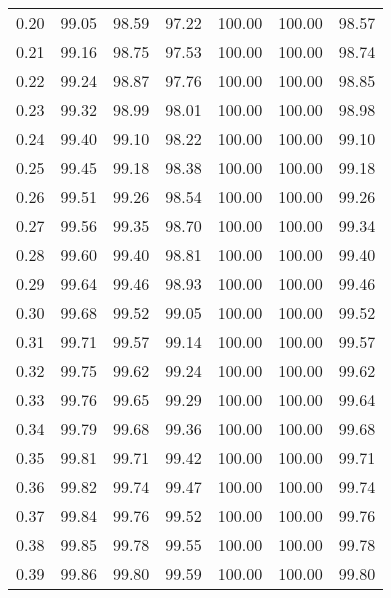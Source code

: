 \begin{tabular}{|c|c|c|c|c|c|c|}
      0.20 &     99.05 &     98.59 &      97.22 &  100.00 &     100.00 &         98.57 \\
      0.21 &     99.16 &     98.75 &      97.53 &  100.00 &     100.00 &         98.74 \\
      0.22 &     99.24 &     98.87 &      97.76 &  100.00 &     100.00 &         98.85 \\
      0.23 &     99.32 &     98.99 &      98.01 &  100.00 &     100.00 &         98.98 \\
      0.24 &     99.40 &     99.10 &      98.22 &  100.00 &     100.00 &         99.10 \\
      0.25 &     99.45 &     99.18 &      98.38 &  100.00 &     100.00 &         99.18 \\
      0.26 &     99.51 &     99.26 &      98.54 &  100.00 &     100.00 &         99.26 \\
      0.27 &     99.56 &     99.35 &      98.70 &  100.00 &     100.00 &         99.34 \\
      0.28 &     99.60 &     99.40 &      98.81 &  100.00 &     100.00 &         99.40 \\
      0.29 &     99.64 &     99.46 &      98.93 &  100.00 &     100.00 &         99.46 \\
      0.30 &     99.68 &     99.52 &      99.05 &  100.00 &     100.00 &         99.52 \\
      0.31 &     99.71 &     99.57 &      99.14 &  100.00 &     100.00 &         99.57 \\
      0.32 &     99.75 &     99.62 &      99.24 &  100.00 &     100.00 &         99.62 \\
      0.33 &     99.76 &     99.65 &      99.29 &  100.00 &     100.00 &         99.64 \\
      0.34 &     99.79 &     99.68 &      99.36 &  100.00 &     100.00 &         99.68 \\
      0.35 &     99.81 &     99.71 &      99.42 &  100.00 &     100.00 &         99.71 \\
      0.36 &     99.82 &     99.74 &      99.47 &  100.00 &     100.00 &         99.74 \\
      0.37 &     99.84 &     99.76 &      99.52 &  100.00 &     100.00 &         99.76 \\
      0.38 &     99.85 &     99.78 &      99.55 &  100.00 &     100.00 &         99.78 \\
      0.39 &     99.86 &     99.80 &      99.59 &  100.00 &     100.00 &         99.80 \\

\end{tabular}
